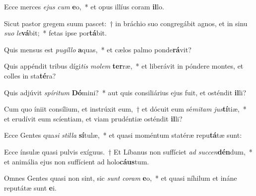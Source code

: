 \item Ecce merces \textit{e}\textit{jus} \textit{cum} \textbf{e}o,~* et opus illíus coram \textbf{il}lo.
\item Sicut pastor gregem suum pascet:~† in bráchio suo congregábit agnos, et in sinu \textit{su}\textit{o} \textit{le}\textbf{vá}bit;~* fetas ipse por\textbf{tá}bit.
\item Quis mensus est \textit{pu}\textit{gíl}\textit{lo} \textbf{a}quas,~* et cælos palmo ponde\textbf{rá}vit?
\item Quis appéndit tribus dígi\textit{tis} \textit{mo}\textit{lem} \textbf{ter}ræ,~* et liberávit in póndere montes, et colles in sta\textbf{té}ra?
\item Quis adjúvit \textit{spí}\textit{ri}\textit{tum} \textbf{Dó}mini?~* aut quis consiliárius ejus fuit, et osténdit \textbf{il}li?
\item Cum quo íniit consílium, et instrúxit eum,~† et dócuit eum sé\textit{mi}\textit{tam} \textit{jus}\textbf{tí}tiæ,~* et erudívit eum scíentiam, et viam prudéntiæ osténdit \textbf{il}li?
\item Ecce Gentes qua\textit{si} \textit{stil}\textit{la} \textbf{sí}tulæ,~* et quasi moméntum statéræ repu\textbf{tá}tæ sunt:
\item Ecce ínsulæ quasi pulvis exíguus.~† Et Líbanus non suffíciet \textit{ad} \textit{suc}\textit{cen}\textbf{dén}dum,~* et animália ejus non suffícient ad holo\textbf{cáus}tum.
\item Omnes Gentes quasi non sint, sic \textit{sunt} \textit{co}\textit{ram} \textbf{e}o,~* et quasi níhilum et ináne reputátæ sunt \textbf{e}i.
